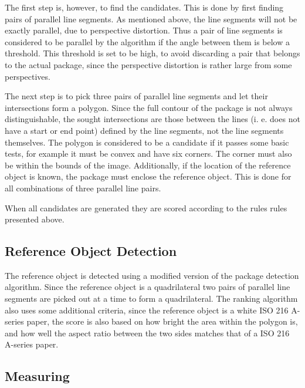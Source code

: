 The first step is, however, to find the candidates.
This is done by first finding pairs of parallel line segments. 
As mentioned above, the line segments will not be exactly parallel, due to perspective distortion. %
Thus a pair of line segments is considered to be parallel by the algorithm if the angle between them is below a threshold. 
This threshold is set to be high, to avoid discarding a pair that belongs to the actual package, since the perspective distortion is rather large from some perspectives. %

The next step is to pick three pairs of parallel line segments and let their intersections form a polygon. 
Since the full contour of the package is not always distinguishable, the sought intersections are those between the lines (i. e. does not have a start or end point) defined by the line segments, not the line segments themselves. %
The polygon is considered to be a candidate if it passes some basic tests, for example it must be convex and have six corners. 
The corner must also be within the bounds of the image.
Additionally, if the location of the reference object is known, the package must enclose the reference object.
This is done for all combinations of three parallel line pairs.

When all candidates are generated they are scored according to the rules rules presented above.

\subsection{Reference Object Detection}

The reference object is detected using a modified version of the package detection algorithm.
Since the reference object is a quadrilateral two pairs of parallel line segments are picked out at a time to form a quadrilateral.
The ranking algorithm also uses some additional criteria, since the reference object is a white ISO 216 A-series  paper, the score is also based on how bright the area within the polygon is, and how well the aspect ratio between the two sides matches that of a ISO 216 A-series paper.

\subsection{Measuring}

